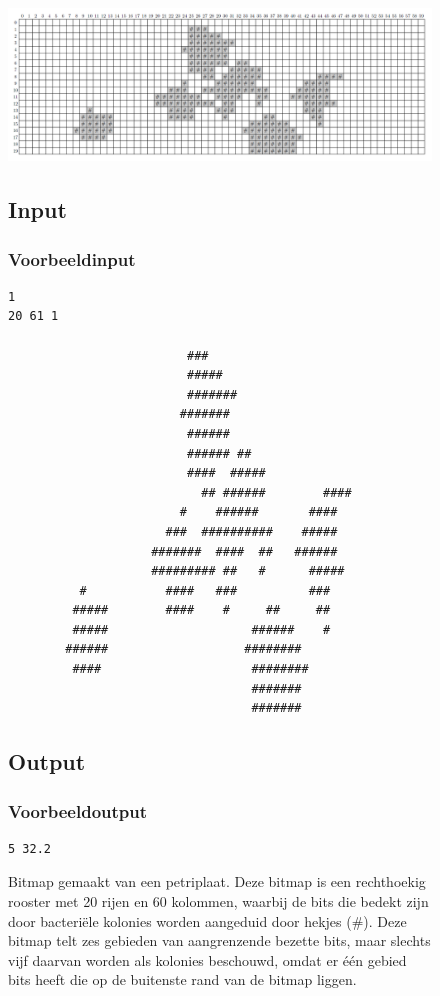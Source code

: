 \begin{figure}[H]
  \begin{center}
    \centerline{\includegraphics[scale=0.30]{koloniepikker/colony_bitmap.png}}
\caption{Bitmap gemaakt van een petriplaat. Deze bitmap is een rechthoekig rooster met 20 rijen en 60 kolommen, waarbij de bits die bedekt zijn door bacteri\"ele kolonies worden aangeduid door hekjes (\#). Deze bitmap telt zes gebieden van aangrenzende bezette bits, maar slechts vijf daarvan worden als kolonies beschouwd, omdat er \'e\'en gebied bits heeft die op de buitenste rand van de bitmap liggen.}
  \end{center}

\subsection*{Input}
\subsubsection*{Voorbeeldinput}
\begin{verbatim}
1
20 61 1

                         ###
                         #####
                         #######
                        #######
                         ######
                         ###### ##
                         ####  #####
                           ## ######        ####
                        #    ######       ####
                      ###  ##########    #####
                    #######  ####  ##   ######
                    ######### ##   #      #####
          #           ####   ###          ###
         #####        ####    #     ##     ##
         #####                    ######    #
        ######                   ########
         ####                     ########
                                  #######
                                  #######
\end{verbatim}
\subsection*{Output}
\subsubsection*{Voorbeeldoutput}
\begin{verbatim}
5 32.2
\end{verbatim}

\end{figure}
